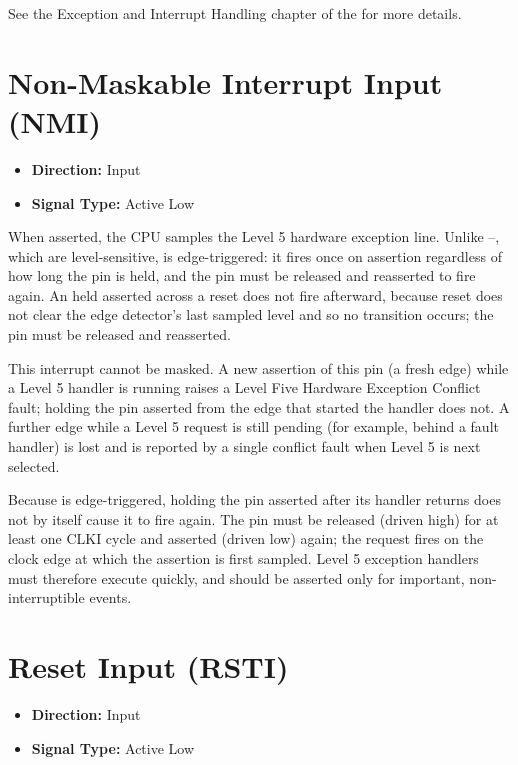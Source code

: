 See the Exception and Interrupt Handling chapter of the \archmanual{} for more details.

\section{Non-Maskable Interrupt Input (NMI)}

\begin{itemize}
	\item \textbf{Direction:} Input
	\item \textbf{Signal Type:} Active Low
\end{itemize}

When asserted, the CPU samples the Level 5 hardware exception line. Unlike --, which
are level-sensitive,  is edge-triggered: it fires once on assertion regardless of how long the pin is
held, and the pin must be released and reasserted to fire again. An  held asserted across a reset does
not fire afterward, because reset does not clear the edge detector's last sampled level and so no transition occurs;
the pin must be released and reasserted.

This interrupt cannot be masked. A new assertion of this pin (a fresh edge) while a Level 5 handler is running raises a
Level Five Hardware Exception Conflict fault; holding the pin asserted from the edge that started the handler does not.
A further edge while a Level 5 request is still pending (for example, behind a fault handler) is lost and is reported
by a single conflict fault when Level 5 is next selected.

Because  is edge-triggered, holding the pin asserted after its handler returns does not by itself cause
it to fire again. The pin must be released (driven high) for at least one CLKI cycle and asserted (driven low) again;
the request fires on the clock edge at which the assertion is first sampled. Level 5 exception handlers must therefore
execute quickly, and  should be asserted only for important, non-interruptible events.

\section{Reset Input (RSTI)}

\begin{itemize}
	\item \textbf{Direction:} Input
	\item \textbf{Signal Type:} Active Low
\end{itemize}

